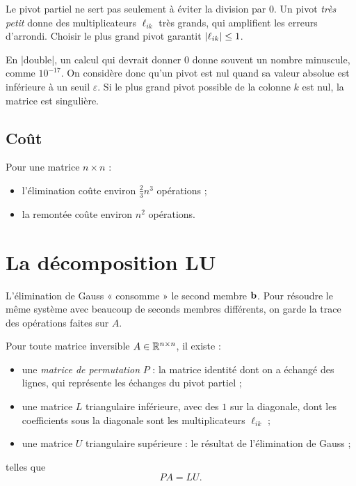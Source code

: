 \begin{remark}
Le pivot partiel ne sert pas seulement à éviter la
division par $0$. Un pivot \emph{très petit} donne
des multiplicateurs $\ell_{ik}$ très grands, qui
amplifient les erreurs d'arrondi. Choisir le plus
grand pivot garantit $\left|\ell_{ik}\right| \le 1$.
\end{remark}

\begin{definition}
En \cpp|double|, un calcul qui devrait donner $0$
donne souvent un nombre minuscule, comme
$10^{-17}$. On considère donc qu'un pivot est nul
quand sa valeur absolue est inférieure à un seuil
$\varepsilon$. Si le plus grand pivot possible de la
colonne $k$ est nul, la matrice est singulière.
\end{definition}

\subsection{Coût}

\begin{proposition}
Pour une matrice $n \times n$ :
\begin{itemize}
    \item l'élimination coûte environ
          $\frac{2}{3} n^3$ opérations ;
    \item la remontée coûte environ $n^2$ opérations.
\end{itemize}
\end{proposition}

\section{La décomposition LU}

L'élimination de Gauss « consomme » le second membre
$\mathbf{b}$. Pour résoudre le même système avec
beaucoup de seconds membres différents, on garde la
trace des opérations faites sur $A$.

\begin{theorem}[Décomposition $PA = LU$]
Pour toute matrice inversible $A \in \mathbb{R}^{n \times n}$,
il existe :
\begin{itemize}
    \item une \emph{matrice de permutation} $P$ : la
          matrice identité dont on a échangé des
          lignes, qui représente les échanges du
          pivot partiel ;
    \item une matrice $L$ triangulaire inférieure, avec
          des $1$ sur la diagonale, dont les
          coefficients sous la diagonale sont les
          multiplicateurs $\ell_{ik}$ ;
    \item une matrice $U$ triangulaire supérieure : le
          résultat de l'élimination de Gauss ;
\end{itemize}
telles que
\[
    PA = LU.
\]
\end{theorem}


